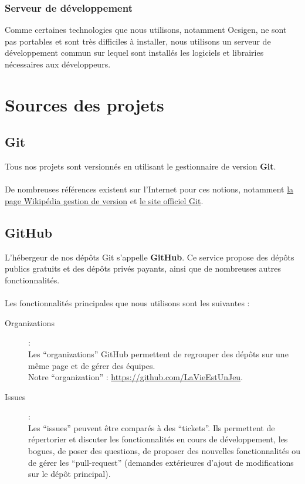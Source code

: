 \documentclass{life-fr}
\begin{document}
\subsubsection{Serveur de développement}

Comme certaines technologies que nous utilisons, notamment Ocsigen, ne
sont pas portables et sont très difficiles à installer, nous utilisons
un serveur de développement commun sur lequel sont installés les
logiciels et librairies nécessaires aux développeurs.

\section{Sources des projets}

\subsection{Git}

Tous nos projets sont versionnés en utilisant le gestionnaire de version
\textbf{Git}.\\
\\
De nombreuses références existent sur l'Internet pour ces notions, notamment
\href{http://fr.wikipedia.org/wiki/Gestion_de_versions}{la page Wikipédia
gestion de version}
et \href{http://git-scm.com/}{le site officiel Git}.

\subsection{GitHub}

L'hébergeur de nos dépôts Git s'appelle \textbf{GitHub}. Ce service
propose des dépôts publics gratuits et des dépôts privés payants,
ainsi que de nombreuses autres fonctionnalités.\\
\\
Les fonctionnalités principales que nous utilisons sont les suivantes :
\begin{description}
  \item [Organizations] : \\
    Les ``organizations'' GitHub permettent de regrouper des dépôts
    sur une même page et de gérer des équipes.\\
    Notre ``organization'' : \url{https://github.com/LaVieEstUnJeu}.
  \item [Issues] : \\
    Les ``issues'' peuvent être comparés à des ``tickets''. Ils permettent
    de répertorier et discuter les fonctionnalités en cours de développement,
    les bogues, de poser des questions, de proposer des nouvelles fonctionnalités
    ou de gérer les ``pull-request'' (demandes extérieures d'ajout de
    modifications sur le dépôt principal).\\
\end{description}
\end{document}

